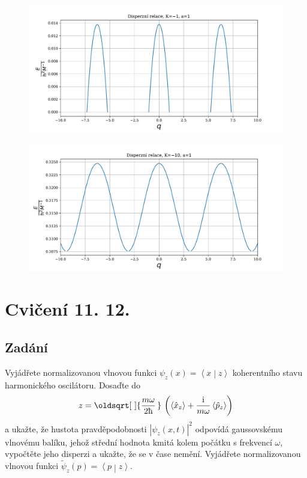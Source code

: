 \documentclass[10pt,a4paper]{article}
\renewcommand*{\sqrt}[2][\ ]{\oldsqrt[#1]{#2\,}\,}
\newcommand{\const}[1]{\text{#1}}
\newcommand{\braket}[2]{\left< #1 \middle| #2 \right>}
\renewcommand{\i}{\const{i}}
\begin{document}
\begin{figure}[!ht]
    \centering
    \includegraphics[scale=0.65]{disperzni-1_neg.pdf}
\end{figure}

\begin{figure}[!ht]
    \centering
    \includegraphics[scale=0.65]{disperzni-10_neg.pdf}
\end{figure}

\pagebreak

\section{Cvičení 11. 12.}
\subsection{Zadání}

Vyjádřete normalizovanou vlnovou funkci $\psi_z(x) = \braket{x}{z}$ koherentního stavu harmonického oscilátoru. Dosaďte do
\begin{align*}
    z = \sqrt{\frac{m\omega}{2\hbar}} \left( \left< \hat{x}_z \right> + \frac{\i}{m\omega} \left< \hat{p}_z \right> \right)
\end{align*}
a ukažte, že hustota pravděpodobnosti $| \psi_z(x, t) |^2$ odpovídá gaussovskému vlnovému balíku, jehož střední hodnota kmitá kolem počátku s frekvencí $\omega$, vypočtěte jeho disperzi a ukažte, že se v čase nemění. Vyjádřete normalizovanou vlnovou funkci $\tilde{\psi}_z(p) = \braket{p}{z}$.
\end{document}
